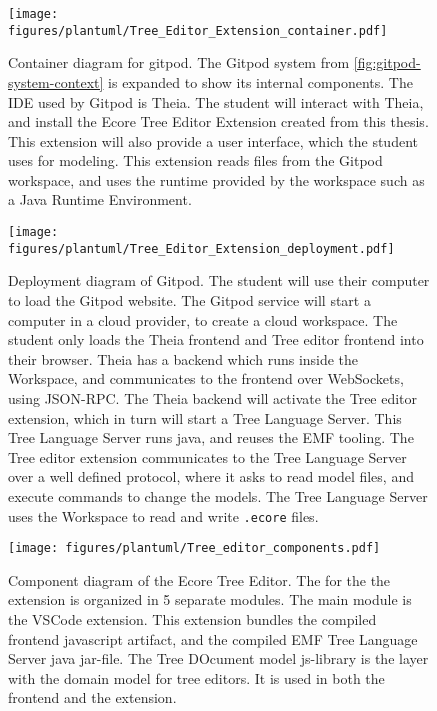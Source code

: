 \begin{figure}[htbp]  %
  \centering
  \texttt{[image: figures/plantuml/Tree\_Editor\_Extension\_container.pdf]}
  \caption[Gitpod container diagram]{Container diagram for gitpod. The Gitpod system from \cref{fig:gitpod-system-context} is expanded to show its internal components. The \acrshort{IDE} used by Gitpod is \gls{Theia}.
  The student will interact with Theia, and install the Ecore Tree Editor Extension created from this thesis.
  This extension will also provide a user interface, which the student uses for modeling.
  This extension reads files from the Gitpod workspace, and uses the runtime provided by the workspace such as a Java Runtime Environment.}\label{fig:gitpod-container-diagram}
\end{figure}

\begin{figure}[htbp]  %
  \centering
  \texttt{[image: figures/plantuml/Tree\_Editor\_Extension\_deployment.pdf]}
  \caption[Gitpod deployment diagram]{Deployment diagram of Gitpod. The student will use their computer to load the Gitpod website.
  The Gitpod service will start a computer in a cloud provider, to create a cloud workspace.
  The student only loads the Theia frontend and Tree editor frontend into their browser.
  Theia has a backend which runs inside the Workspace, and communicates to the frontend over WebSockets, using JSON-RPC\@.
  The Theia backend will activate the Tree editor extension, which in turn will start a Tree Language Server.
  This Tree Language Server runs java, and reuses the \acrshort{EMF} tooling.
  The Tree editor extension communicates to the Tree Language Server over a well defined protocol, where it asks to read model files, and execute commands to change the models.
  The Tree Language Server uses the Workspace to read and write \texttt{.ecore} files.}\label{fig:gitpod-deployment-diagram}
\end{figure}

\begin{figure}[htbp]  %
  \centering
  \texttt{[image: figures/plantuml/Tree\_editor\_components.pdf]}
  \caption[Ecore Tree Editor component diagram]{Component diagram of the Ecore Tree Editor.
  The for the the extension is organized in 5 separate modules.
  The main module is the VSCode extension.
  This extension bundles the compiled frontend javascript artifact, and the compiled EMF Tree Language Server java jar-file.
  The Tree DOcument model js-library is the layer with the domain model for tree editors.
  It is used in both the frontend and the extension.
  }\label{fig:label4}
\end{figure}

